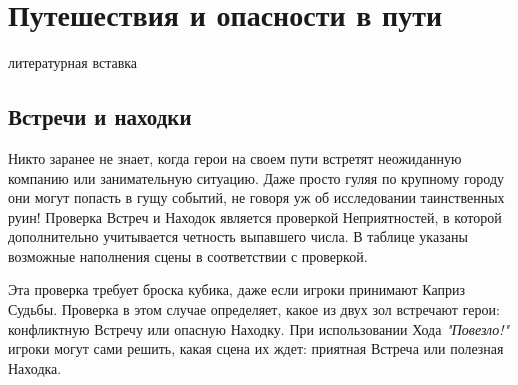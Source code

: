 \chapter{Путешествия и опасности в пути}
\tbd литературная вставка

\section{Встречи и находки}
Никто заранее не знает, когда герои на своем пути встретят неожиданную компанию или занимательную ситуацию. Даже просто гуляя по крупному городу они могут попасть в гущу событий, не говоря уж об исследовании таинственных руин!
\newline Проверка Встреч и Находок является проверкой Неприятностей, в которой дополнительно учитывается четность выпавшего числа. В таблице указаны возможные наполнения сцены в соответствии с проверкой.

\begin{tcolorbox}
Эта проверка требует броска кубика, даже если игроки принимают Каприз Судьбы. Проверка в этом случае определяет, какое из двух зол встречают герои: конфликтную Встречу или опасную Находку.
\newline При использовании Хода \textit{"Повезло!"} игроки могут сами решить, какая сцена их ждет: приятная Встреча или полезная Находка.
\end{tcolorbox}

